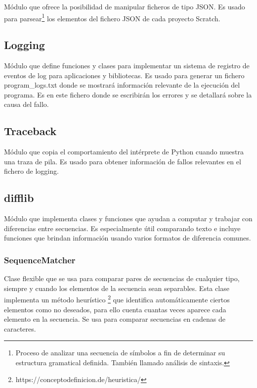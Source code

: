 \documentclass[a4paper, 12pt]{book}
\begin{document}
Módulo que ofrece la posibilidad de manipular ficheros de tipo JSON. Es usado para parsear\footnote{Proceso de analizar una secuencia de símbolos a fin de determinar su estructura gramatical definida. También llamado análisis de sintaxis.} los elementos del fichero JSON de cada proyecto Scratch.

\subsection{Logging}
\label{sec:logging}

Módulo que define funciones y clases para implementar un sistema de registro de eventos de log para aplicaciones y bibliotecas. Es usado para generar un fichero program\_logs.txt donde se mostrará información relevante de la ejecución del programa. Es en este fichero donde se escribirán los errores y se detallará sobre la causa del fallo.

\subsection{Traceback}
\label{sec:traceback}

Módulo que copia el comportamiento del intérprete de Python cuando muestra una traza de pila. Es usado para obtener información de fallos relevantes en el fichero de logging.

\subsection{difflib}
\label{sec:difflib}

Módulo que implementa clases y funciones que ayudan a computar y trabajar con diferencias entre secuencias. Es especialmente útil comparando texto e incluye funciones que brindan información usando varios formatos de diferencia comunes.

\subsubsection{SequenceMatcher}
\label{sec:difflib_SequenceMatcher} 

Clase flexible que se usa para comparar pares de secuencias de cualquier tipo, siempre y cuando los elementos de la secuencia sean separables. Esta clase implementa un método heurístico \footnote{https://conceptodefinicion.de/heuristica/} que identifica automáticamente ciertos elementos como no deseados, para ello cuenta cuantas veces aparece cada elemento en la secuencia. Se usa para comparar secuencias en cadenas de caracteres.
\end{document}
